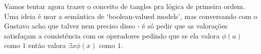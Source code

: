 \documentclass[11pt]{article}
\theoremstyle{definition}
\theoremstyle{definition}
\theoremstyle{definition}
\theoremstyle{definition}
\theoremstyle{definition}
\theoremstyle{definition}
\theoremstyle{definition}
\theoremstyle{definition}
\theoremstyle{definition}
\theoremstyle{definition}
\theoremstyle{definition}
\theoremstyle{definition}
\theoremstyle{definition}
\theoremstyle{definition}
\begin{document}
Vamos tentar agora trazer o conceito de tangles pra lógica de primeira ordem. Uma ideia é usar a semântica de `boolean-valued models', mas conversando com o Gustavo acho que talvez nem preciso disso - é só pedir que as valorações satisfaçam a consistência com os operadores pedindo que se ela valora $\phi(a)$ como $1$ então valora $\exists x \phi(x)$ como $1$.





















  
  





\end{document}
